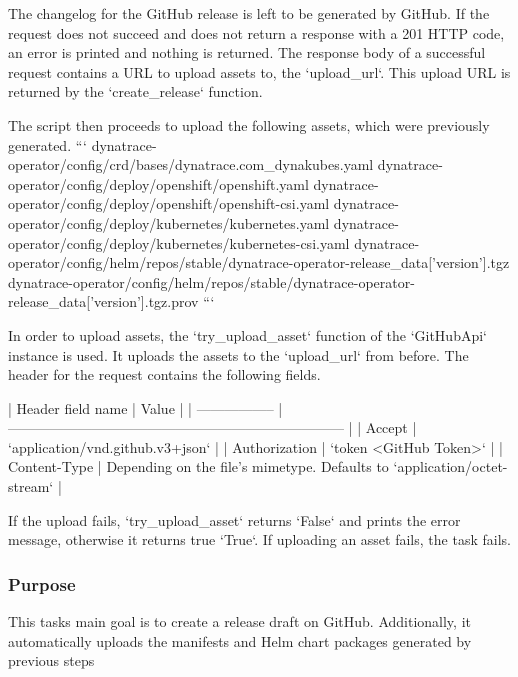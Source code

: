 The changelog for the GitHub release is left to be generated by GitHub.
If the request does not succeed and does not return a response with a 201 HTTP code, an error is printed and nothing is returned.
The response body of a successful request contains a URL to upload assets to, the `upload_url`.
This upload URL is returned by the `create_release` function.

The script then proceeds to upload the following assets, which were previously generated.
```
dynatrace-operator/config/crd/bases/dynatrace.com_dynakubes.yaml
dynatrace-operator/config/deploy/openshift/openshift.yaml
dynatrace-operator/config/deploy/openshift/openshift-csi.yaml
dynatrace-operator/config/deploy/kubernetes/kubernetes.yaml
dynatrace-operator/config/deploy/kubernetes/kubernetes-csi.yaml
dynatrace-operator/config/helm/repos/stable/dynatrace-operator-{release_data['version']}.tgz
dynatrace-operator/config/helm/repos/stable/dynatrace-operator-{release_data['version']}.tgz.prov
```

In order to upload assets, the `try_upload_asset` function of the `GitHubApi` instance is used.
It uploads the assets to the `upload_url` from before.
The header for the request contains the following fields.

| Header field name | Value                                                                    |
| ----------------- | ------------------------------------------------------------------------ |
| Accept            | `application/vnd.github.v3+json`                                         |
| Authorization     | `token <GitHub Token>`                                                   |
| Content-Type      | Depending on the file's mimetype. Defaults to `application/octet-stream` |

If the upload fails, `try_upload_asset` returns `False` and prints the error message, otherwise it returns true `True`.
If uploading an asset fails, the task fails.

\subsubsection{Purpose}\label{subsubsec:release-github-Purpose}

This tasks main goal is to create a release draft on GitHub.
Additionally, it automatically uploads the manifests and Helm chart packages generated by previous steps

